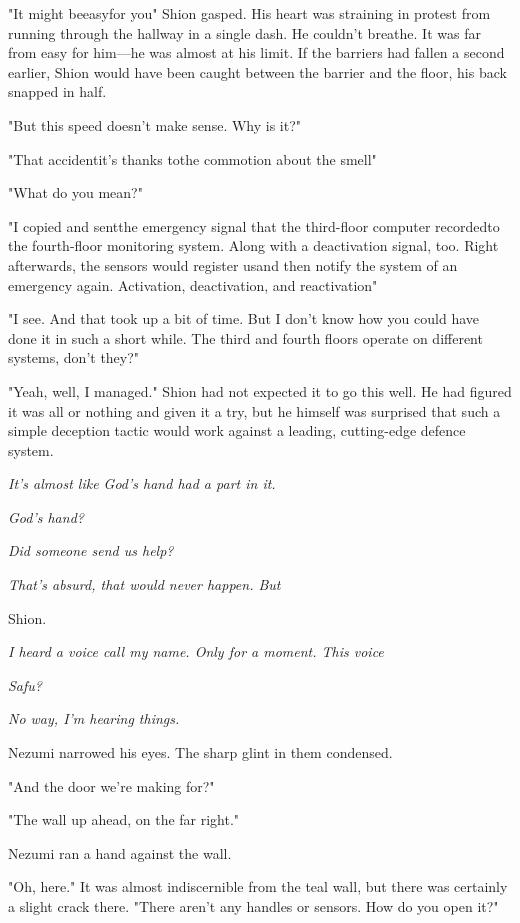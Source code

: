 "It might be\el easy\el for you\el " Shion gasped. His heart was
straining in protest from running through the hallway in a single dash.
He couldn't breathe. It was far from easy for him---he was almost at his
limit. If the barriers had fallen a second earlier, Shion would have
been caught between the barrier and the floor, his back snapped in half.

"But this speed doesn't make sense. Why is it?"

"That accident\el it's thanks to\el the commotion about the smell\el "

"What do you mean?"

"I copied and sent\el the emergency signal that the third-floor computer
recorded\el to the fourth-floor monitoring system. Along with a
deactivation signal, too. Right afterwards, the sensors would register
us\el and then notify the system of an emergency again. Activation,
deactivation, and reactivation\el "

"I see. And that took up a bit of time. But I don't know how you could
have done it in such a short while. The third and fourth floors operate
on different systems, don't they?"

"\el Yeah, well, I managed." Shion had not expected it to go this well.
He had figured it was all or nothing and given it a try, but he himself
was surprised that such a simple deception tactic would work against a
leading, cutting-edge defence system.

\emph{It's almost like God's hand had a part in it.}

\emph{God's hand?}

\emph{Did someone send us help?}

\emph{That's absurd, that would never happen. But\el }

Shion.

\emph{I heard a voice call my name. Only for a moment. This voice\el }

\emph{Safu?}

\emph{No way, I'm hearing things.}

Nezumi narrowed his eyes. The sharp glint in them condensed.

"And the door we're making for?"

"The wall up ahead, on the far right."

Nezumi ran a hand against the wall.

"Oh, here." It was almost indiscernible from the teal wall, but there
was certainly a slight crack there. "There aren't any handles or
sensors. How do you open it?"

